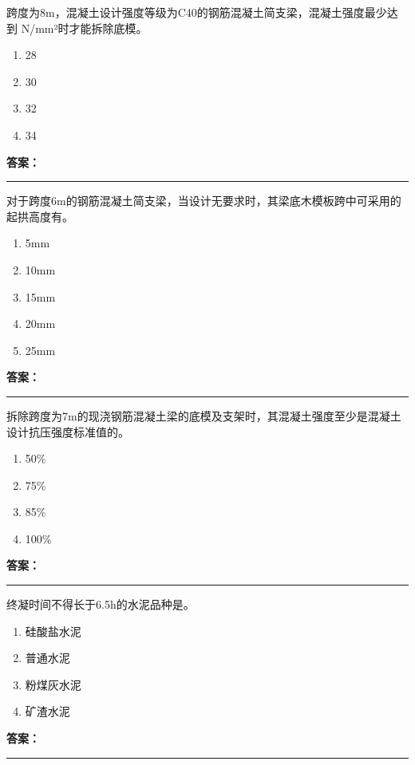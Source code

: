 \documentclass[UTF8,fontset=fandol,11pt]{ctexart}
\newcommand{\answerline}{\textcolor{answerred}{\rule{2.4cm}{0.7pt}}}
\begin{document}
\vspace{0.2em}

\begin{quizbox}[title={第 39 题}]
跨度为8m，混凝土设计强度等级为C40的钢筋混凝土简支梁，混凝土强度最少达到 N/mm²时才能拆除底模。\\
\begin{enumerate}[label=\Alph*.]
\item 28
\item 30
\item 32
\item 34
\end{enumerate}
\textbf{\textcolor{answerred}{答案：}} \answerline
\end{quizbox}

\vspace{0.2em}

\begin{quizbox}[title={第 40 题}]
对于跨度6m的钢筋混凝土简支梁，当设计无要求时，其梁底木模板跨中可采用的起拱高度有。\\
\begin{enumerate}[label=\Alph*.]
\item 5mm
\item 10mm
\item 15mm
\item 20mm
\item 25mm
\end{enumerate}
\textbf{\textcolor{answerred}{答案：}} \answerline
\end{quizbox}

\vspace{0.2em}

\begin{quizbox}[title={第 41 题}]
拆除跨度为7m的现浇钢筋混凝土梁的底模及支架时，其混凝土强度至少是混凝土设计抗压强度标准值的。\\
\begin{enumerate}[label=\Alph*.]
\item 50\%
\item 75\%
\item 85\%
\item 100\%
\end{enumerate}
\textbf{\textcolor{answerred}{答案：}} \answerline
\end{quizbox}

\vspace{0.2em}

\begin{quizbox}[title={第 42 题}]
终凝时间不得长于6.5h的水泥品种是。\\
\begin{enumerate}[label=\Alph*.]
\item 硅酸盐水泥
\item 普通水泥
\item 粉煤灰水泥
\item 矿渣水泥
\end{enumerate}
\textbf{\textcolor{answerred}{答案：}} \answerline
\end{quizbox}
\end{document}
